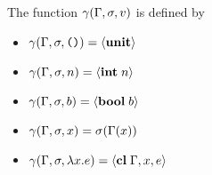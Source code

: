 \documentclass{article}
\begin{document}
\begin{minipage}{\textwidth}
\begin{minipage}[t]{0.50\textwidth}
The function $\gamma(\Gamma,\sigma,v)$ is defined by

\begin{itemize}
  \item $\gamma(\Gamma,\sigma,\text{\texttt{()}}) = \langle\mathbf{unit}\rangle$
  \item $\gamma(\Gamma,\sigma,n) = \langle\mathbf{int}\; n\rangle$
  \item $\gamma(\Gamma,\sigma,b) = \langle\mathbf{bool}\; b\rangle$
  \item $\gamma(\Gamma,\sigma,x) = \sigma(\Gamma(x))$
  \item $\gamma(\Gamma,\sigma,\lambda x.e) = \langle\mathbf{cl}\; \Gamma,x,e\rangle$
\end{itemize}

\end{minipage}
\end{minipage}
\end{document}
